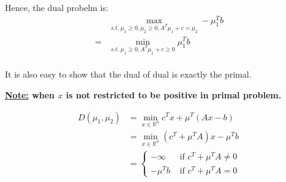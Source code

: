 \documentclass[11pt,a4paper]{article}
\begin{document}
Hence, the dual probelm is:
\begin{equation}
    \begin{aligned}
        &\max_{s.t.\ \mu_1\geq 0,\mu_2\geq 0, A^T\mu_1+c=\mu_2}-\mu_1^Tb\\
        =&\min_{s.t.\ \mu_1\geq 0, A^T\mu_1+c\geq 0}\mu_1^Tb\\
    \end{aligned}
    \nonumber
\end{equation}
\begin{center}
\end{center}
It is also easy to show that the dual of dual is exactly the primal.

\textbf{\underline{Note:} when $x$ is not restricted to be positive in primal problem.}
\begin{center}
\end{center}
\begin{equation}
    \begin{aligned}
        D(\mu_1,\mu_2)
        &=\min_{x\in \mathbb{R}^n}c^Tx+\mu^T(Ax-b)\\
        &=\min_{x\in \mathbb{R}^n}(c^T+\mu^TA)x-\mu^Tb\\
        &=\left\{\begin{matrix}
            -\infty&\text{ if }c^T+\mu^TA\neq 0\\
            -\mu^Tb&\text{ if }c^T+\mu^TA=0
        \end{matrix}\right.
    \end{aligned}
    \nonumber
\end{equation}
\end{document}
